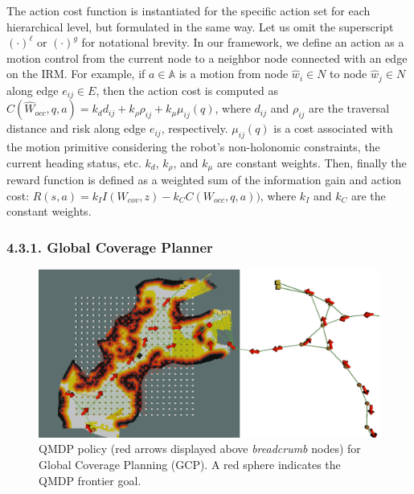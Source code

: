 \documentclass[letterpaper]{article} %
\newcommand{\phdone}[1]{} %
\begin{document}


\phdone{Reward Function--Action Cost}
The action cost function is instantiated for the specific action set for each hierarchical level, but formulated in the same way.
Let us omit the superscript $(\cdot)^\ell$ or $(\cdot)^g$ for notational brevity.
In our framework, we define an action as a motion control from the current node to a neighbor node connected with an edge on the IRM.
For example, if $a \in \mathbb{A}$ is a motion from node $\hat{w}_i \in N$ to node $\hat{w}_j \in N$ along edge $e_{ij} \in E$, then the action cost is computed as
$C(\hat{W}_{occ}, q, a) = k_d d_{ij} + k_\rho \rho_{ij} + k_\mu \mu_{ij}(q)$,
where $d_{ij}$ and $\rho_{ij}$ are the traversal distance and risk along edge $e_{ij}$, respectively.
$\mu_{ij}(q)$ is a cost associated with the motion primitive considering the robot's non-holonomic constraints, the current heading status, etc.
$k_d$, $k_\rho$, and $k_\mu$ are constant weights.
Then, finally the reward function is defined as a weighted sum of the information gain and action cost:
$R(s, a) = k_I I(W_{cov}, z) - k_C C(W_{occ}, q, a))$,
where $k_I$ and $k_C$ are the constant weights.



\subsubsection{4.3.1. Global Coverage Planner} \label{sssec:GCP}
\begin{figure}[t!]
  \centering
  \includegraphics[width=.8\columnwidth]{figures/QMDP_Policy.png}
  \caption{QMDP policy (red arrows displayed above \textit{breadcrumb} nodes) for Global Coverage Planning (GCP). A red sphere indicates the QMDP frontier goal.}
  \label{fig:graph-level-planner}
\end{figure}
\end{document}
